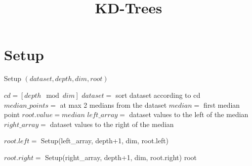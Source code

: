 \documentclass{article}
\title{KD-Trees}
\author{}
\date{}
\begin{document}
\maketitle

\section{Setup}
\begin{algorithm}
\caption{Setup $(dataset, depth, dim, root)$}\label{alg:cap}
\begin{algorithmic}
\State $cd = [depth \mod dim]$
\State $dataset =$ sort dataset according to cd
\State $median\_points = $ at max 2 medians from the dataset
\State $median = $ first median point
\State $root.value = median$
\State $left\_array = $ dataset values to the left of the median
\State $right\_array = $ dataset values to the right of the median

\State $root.left = $ Setup(left\_array, depth+1, dim, root.left)
\EndIf

\State $root.right = $ Setup(right\_array, depth+1, dim, root.right)
\EndIf
\State \Return root
\end{algorithmic}
\end{algorithm}
\end{document}
